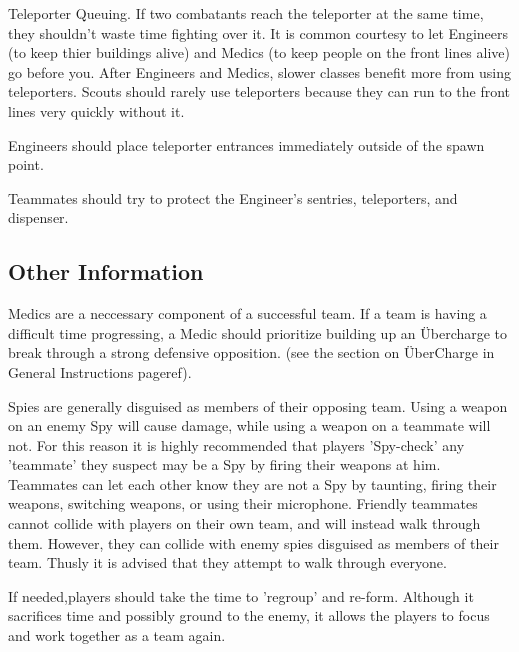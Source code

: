 Teleporter Queuing.  If two combatants reach the teleporter at the same time, they shouldn't waste time fighting over it. It is common courtesy to let Engineers (to keep thier buildings alive) and Medics (to keep people on the front lines alive) go before you. After Engineers and Medics, slower classes benefit more from using teleporters. Scouts should rarely use teleporters because they can run to the front lines very quickly without it.

Engineers should place teleporter entrances immediately outside of the spawn point. 

Teammates should try to protect the Engineer's sentries, teleporters, and dispenser.

\subsection{Other Information}
Medics are a neccessary component of a successful team. If a team is having a difficult time progressing, a Medic should prioritize building up an Übercharge to break through a strong defensive opposition. (see the section on ÜberCharge in General Instructions {{pageref}}).

Spies are generally disguised as members of their opposing team. Using a weapon on an enemy Spy will cause damage, while using a weapon on a teammate will not. For this reason it is highly recommended that players 'Spy-check' any 'teammate' they suspect may be a Spy by firing their weapons at him. Teammates can let each other know they are not a Spy by taunting, firing their weapons, switching weapons, or using their microphone. Friendly teammates cannot collide with players on their own team, and will instead walk through them. However, they can collide with enemy spies disguised as members of their team. Thusly it is advised that they attempt to walk through everyone.

If needed,players should take the time to 'regroup' and re-form. Although it sacrifices time and possibly ground to the enemy, it allows the players to focus and work together as a team again.